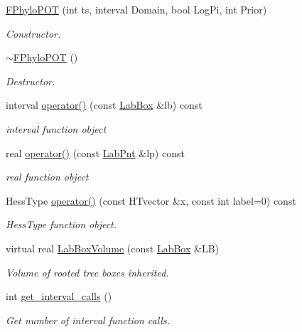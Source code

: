 \begin{DoxyCompactItemize}
\item 
\hyperlink{classFPhyloPOT_a4e454a840e146021548eb181cb4a0c46}{\-F\-Phylo\-P\-O\-T} (int ts, interval \-Domain, bool \-Log\-Pi, int \-Prior)
\begin{DoxyCompactList}\small\item\em \-Constructor. \end{DoxyCompactList}\item 
\hyperlink{classFPhyloPOT_afe2d7cca8b4c06e2c3e7c7dcc94e9826}{$\sim$\-F\-Phylo\-P\-O\-T} ()
\begin{DoxyCompactList}\small\item\em \-Destructor. \end{DoxyCompactList}\item 
interval \hyperlink{classFPhyloPOT_a4d0a6125142aba97d718b11d8b8fc909}{operator()} (const \hyperlink{classLabBox}{\-Lab\-Box} \&lb) const 
\begin{DoxyCompactList}\small\item\em interval function object \end{DoxyCompactList}\item 
real \hyperlink{classFPhyloPOT_afdf1491ae76809442d33e224b4607102}{operator()} (const \hyperlink{classLabPnt}{\-Lab\-Pnt} \&lp) const 
\begin{DoxyCompactList}\small\item\em real function object \end{DoxyCompactList}\item 
\-Hess\-Type \hyperlink{classFPhyloPOT_a8a259ba9d2704e586dc2dcea268dc8e8}{operator()} (const \-H\-Tvector \&x, const int label=0) const 
\begin{DoxyCompactList}\small\item\em \-Hess\-Type function object. \end{DoxyCompactList}\item 
virtual real \hyperlink{classFPhyloPOT_a580e93411b4a2dd881f4854481a8aeef}{\-Lab\-Box\-Volume} (const \hyperlink{classLabBox}{\-Lab\-Box} \&\-L\-B)
\begin{DoxyCompactList}\small\item\em \-Volume of rooted tree boxes inherited. \end{DoxyCompactList}\item 
int \hyperlink{classFPhyloPOT_af1164c3a4f529f5b4af38d18c79f7b47}{get\-\_\-interval\-\_\-calls} ()
\begin{DoxyCompactList}\small\item\em \-Get number of interval function calls. \end{DoxyCompactList}\item 

\end{DoxyCompactItemize}

